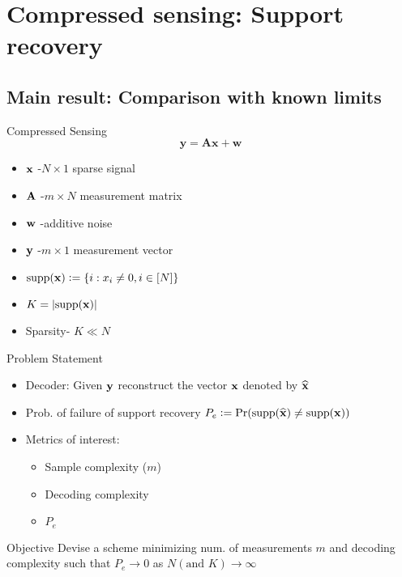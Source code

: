 \section{Compressed sensing: Support recovery}
\subsection{Main result: Comparison with known limits}
\begin{frame}{Compressed Sensing}
\begin{equation*}
\mathbf{y=Ax +w}
\end{equation*}


\begin{itemize}
\item $\mathbf{x}$ -$N \times 1$ sparse signal
\item $\mathbf{A}$ -$m \times N$ measurement matrix
\item $\mathbf{w}$ -additive noise
\item $\mathbf{y}$ -$m \times 1$ measurement vector
\item $\text{supp}(\mathbf{x})\mathrel{\mathop:}= \{i: x_i\neq 0, i\in [N]\}$
\item $K=\lvert{\text{supp}(\mathbf{x})}\rvert$
\item Sparsity- $K\ll N$ 
\end{itemize}
\end{frame}

\begin{frame}{Problem Statement}
\begin{itemize}
\item Decoder: Given $\mathbf{y}$ reconstruct the vector $\mathbf{x}$ denoted by $\widehat{\mathbf{x}}$
\item Prob. of failure of support recovery $P_e\mathrel{\mathop:}= \text{Pr}(\text{supp}(\widehat{\mathbf{x}})\neq \text{supp}(\mathbf{x}))$
\item Metrics of interest:
\begin{itemize}
\item Sample complexity ($m$)
\item Decoding complexity
\item $P_e$
\end{itemize} 
\end{itemize}
\vspace{5ex}

\begin{block}{Objective}
Devise a scheme minimizing num. of measurements $m$ and decoding complexity such that $P_e\rightarrow 0$ as $N (\text{and } K) \rightarrow \infty$
\end{block}
\end{frame}

